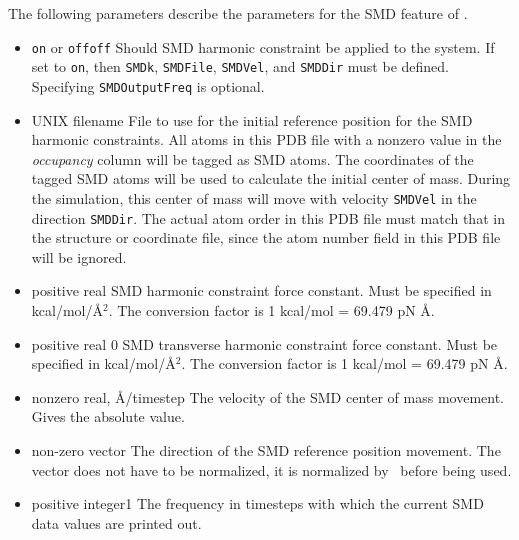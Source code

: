 The following parameters describe the parameters for the 
SMD feature of \NAMD.
\begin{itemize}
\item 
{}
{{\tt on} or {\tt off}}{{\tt off}}
{Should SMD harmonic constraint be applied to the system. If set 
to {\tt on}, then  {\tt SMDk}, {\tt SMDFile}, {\tt SMDVel}, and
{\tt SMDDir} must be defined.  Specifying {\tt SMDOutputFreq} 
is optional.}

\item
{}
{UNIX filename} {File to use for the initial reference position for the SMD
harmonic constraints.  All atoms in this PDB file with a nonzero value in the
{\em occupancy} column will be tagged as SMD atoms.  The coordinates of the
tagged SMD atoms will be used to calculate the initial center of mass.
During the simulation, this center of mass will move with velocity
{\tt SMDVel} in the direction {\tt SMDDir}. The actual atom order in this PDB
file must match that in the structure or coordinate file, since the atom
number field in this PDB file will be ignored.}

\item
{}
{positive real}
{SMD harmonic constraint force constant. Must be specified in
kcal/mol/\AA$^2$. The conversion factor is 1 kcal/mol = 69.479 pN \AA.} 

\item
{}
{positive real}
{0}
{SMD transverse harmonic constraint force constant.
Must be specified in kcal/mol/\AA$^2$.
The conversion factor is 1 kcal/mol = 69.479 pN \AA.} 

\item
{}
{nonzero real, \AA/timestep}
{The velocity of the SMD center of mass movement. Gives the absolute
value.}

\item
{}
{non-zero vector}
{The direction of the SMD reference position movement. The vector does
not have to be normalized, it is normalized by \NAMD\ before being used.}

\item
{}
{positive integer}{1} {The frequency in timesteps with which the
current SMD data values are printed out.}
\end{itemize}


